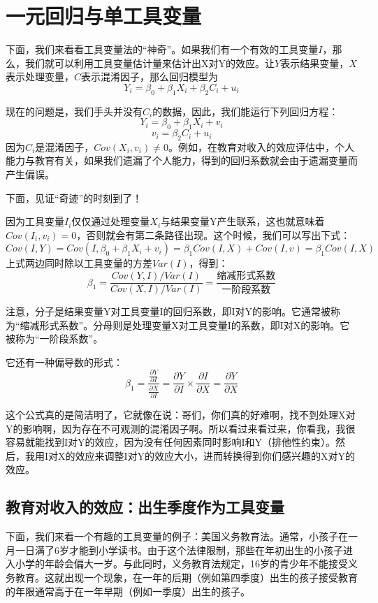 \documentclass[cn,12pt,math=newtx,citestyle=gb7714-2015,bibstyle=gb7714-2015]{elegantbook}
\begin{document}
	\section{一元回归与单工具变量}
	下面，我们来看看工具变量法的“神奇”。如果我们有一个有效的工具变量$I$，那么，我们就可以利用工具变量估计量来估计出X对Y的效应。让$Y$表示结果变量，$X$表示处理变量，$C$表示混淆因子，那么回归模型为
	\begin{equation}
		Y_i=\beta_0+\beta_1X_i+\beta_2 C_i+u_i
	\end{equation}
	
    现在的问题是，我们手头并没有$C_i$的数据，因此，我们能运行下列回归方程：
    $$Y_i=\beta_0+\beta_1X_i+v_i$$
    $$v_i=\beta_2 C_i+u_i$$
    因为$C_i$是混淆因子，$Cov(X_i,v_i) \neq 0$。例如，在教育对收入的效应评估中，个人能力与教育有关，如果我们遗漏了个人能力，得到的回归系数就会由于遗漏变量而产生偏误。
    
    下面，见证“奇迹”的时刻到了！
    
    因为工具变量$I_i$仅仅通过处理变量$X_i$与结果变量Y产生联系，这也就意味着$Cov(I_i,v_i)=0$，否则就会有第二条路径出现。这个时候，我们可以写出下式：
    $$Cov(I,Y)=Cov(I,\beta_0+\beta_1X_i+v_i)=\beta_1 Cov(I,X)+Cov(I,v)=\beta_1 Cov(I,X)$$
    上式两边同时除以工具变量的方差$Var(I)$，得到：
    $$\beta_1=\frac{Cov(Y,I)/Var(I)}{Cov(X,I)/Var(I)}=\frac{缩减形式系数}{一阶段系数}$$
    
    注意，分子是结果变量Y对工具变量I的回归系数，即I对Y的影响。它通常被称为“缩减形式系数”。分母则是处理变量X对工具变量I的系数，即I对X的影响。它被称为“一阶段系数”。
    
    它还有一种偏导数的形式：
    $$\beta_1=\frac{\frac{\partial Y}{\partial I}}{\frac{\partial X}{\partial I}}=\frac{\partial Y}{\partial I}\times \frac{\partial I}{\partial X}=\frac{\partial Y}{\partial X}$$
    
    这个公式真的是简洁明了，它就像在说：哥们，你们真的好难啊，找不到处理X对Y的影响啊，因为存在不可观测的混淆因子啊。所以看过来看过来，你看我，我很容易就能找到I对Y的效应，因为没有任何因素同时影响I和Y（排他性约束）。然后，我用I对X的效应来调整I对Y的效应大小，进而转换得到你们感兴趣的X对Y的效应。
    
    \subsection{教育对收入的效应：出生季度作为工具变量}
    
    下面，我们来看一个有趣的工具变量的例子：美国义务教育法。通常，小孩子在一月一日满了6岁才能到小学读书。由于这个法律限制，那些在年初出生的小孩子进入小学的年龄会偏大一岁。与此同时，义务教育法规定，16岁的青少年不能接受义务教育。这就出现一个现象，在一年的后期（例如第四季度）出生的孩子接受教育的年限通常高于在一年早期（例如一季度）出生的孩子。
    
\end{document}
